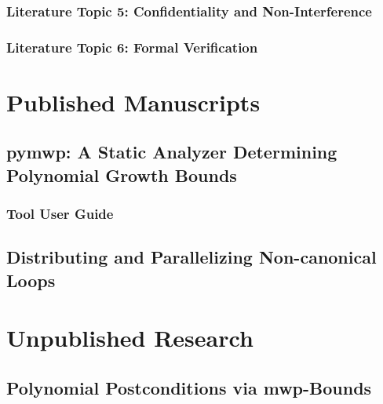         \subsection{Literature Topic 5: Confidentiality and Non-Interference}
        \label{pl-sec}
        

        \subsection{Literature Topic 6: Formal Verification}
        \label{verification}
        

\chapter{Published Manuscripts}\label{published-manuscripts}
\clearpage

    \section{pymwp: A Static Analyzer Determining Polynomial Growth Bounds}
    \label{sec:atva}
    
    \clearpage

    \subsection{Tool User Guide}\label{app:toolguide}
    
    \clearpage

    \section{Distributing and Parallelizing Non-canonical Loops}
    \label{sec:vmcai}
    
    \clearpage

\chapter{Unpublished Research}\label{ch:unpublished-research}
\clearpage

    \section{Polynomial Postconditions via mwp-Bounds}\label{sec:postcond}
    
    \clearpage

